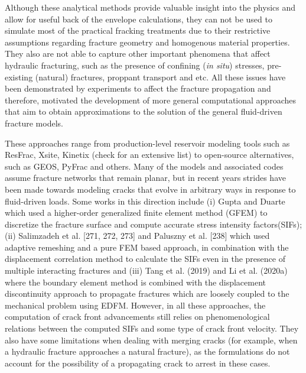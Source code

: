     Although these analytical methods provide valuable insight into the physics and allow for useful back of the envelope calculations, they can not be used to simulate most of the practical fracking treatments due to their restrictive assumptions regarding fracture geometry and homogenous material properties. They also are not able to capture other important phenomena that affect hydraulic fracturing, such as the presence of confining (\textit{in situ}) stresses, pre-existing (natural) fractures, proppant transport and etc.
    All these issues have been demonstrated by experiments to affect the fracture propagation and therefore, motivated the development of more general computational approaches that aim to obtain approximations to the solution of the general fluid-driven fracture models.

    These approaches range from production-level reservoir modeling tools such as ResFrac\cite{mcclure2017three, mcclure2018resfrac}, Xsite\cite{itasca}, Kinetix\cite{kinetix,kinetixforpetrel} (check \cite{chen2021review} for an extensive list) to open-source alternatives, such as GEOS\cite{settgast2012simulation, settgast2014simulation, settgast2017fully}, PyFrac\cite{zia2020pyfrac} and others. Many of the models and associated codes assume fracture networks that remain planar, but in recent years strides have been made towards modeling cracks that evolve in arbitrary ways in response to fluid-driven loads. Some works in this direction include (i) Gupta and Duarte \cite{gupta2014simulation, gupta2018coupled} which used a higher-order generalized finite element method (GFEM) to discretize the fracture surface and compute accurate stress intensity factors(SIFs); (ii) Salimzadeh et al. [271, 272, 273] and Paluszny et al. [238] which used adaptive remeshing and a pure FEM based approach, in combination with the displacement correlation method to calculate the SIFs even in the presence of multiple interacting fractures and (iii) Tang et al. (2019) and Li et al. (2020a) where the boundary element method is combined with the displacement discontinuity approach to propagate fractures which are loosely coupled to the mechanical problem using EDFM\cite{hajibeygi2011hierarchical}. However, in all these approaches, the computation of crack front advancements still relies on phenomenological relations between the computed SIFs and some type of crack front velocity. They also have some limitations when dealing with merging cracks (for example, when a hydraulic fracture approaches a natural fracture), as the formulations do not account for the possibility of a propagating crack to arrest in these cases.
    
